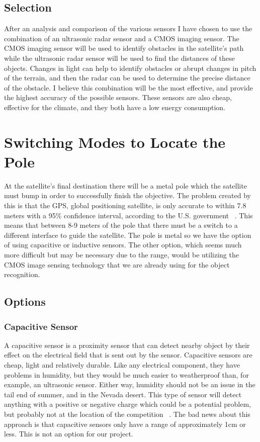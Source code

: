 \documentclass[10pt,letterpaper,onecolumn,journal]{IEEEtran}
\begin{document}
\subsection{Selection}
After an analysis and comparison of the various sensors I have chosen to use the combination of an ultrasonic radar sensor and a CMOS imaging sensor. The CMOS imaging sensor will be used to identify obstacles in the satellite’s path while the ultrasonic radar sensor will be used to find the distances of these objects. Changes in light can help to identify obstacles or abrupt changes in pitch of the terrain, and then the radar can be used to determine the precise distance of the obstacle. I believe this combination will be the most effective, and provide the highest accuracy of the possible sensors. These sensors are also cheap, effective for the climate, and they both have a low energy consumption.

\section{Switching Modes to Locate the Pole}
At the satellite’s final destination there will be a metal pole which the satellite must bump in order to successfully finish the objective. The problem created by this is that the GPS, global positioning satellite, is only accurate to within 7.8 meters with a 95\% confidence interval, according to the U.S. government ~\cite{gps.gov2016}. This means that between 8-9 meters of the pole that there must be a switch to a different interface to guide the satellite. The pole is metal so we have the option of using capacitive or inductive sensors. The other option, which seems much more difficult but may be necessary due to the range, would be utilizing the CMOS image sensing technology that we are already using for the object recognition.

\subsection{Options}
\subsubsection{Capacitive Sensor}
A capacitive sensor is a proximity sensor that can detect nearby object by their effect on the electrical field that is sent out by the sensor. Capacitive sensors are cheap, light and relatively durable. Like any electrical component, they have problems in humidity, but they would be much easier to weatherproof than, for example, an ultrasonic sensor. Either way, humidity should not be an issue in the tail end of summer, and in the Nevada desert. This type of sensor will detect anything with a positive or negative charge which could be a potential problem, but probably not at the location of the competition ~\cite{capacitive}. The bad news about this approach is that capacitive sensors only have a range of approximately 1cm or less. This is not an option for our project.
\end{document}

